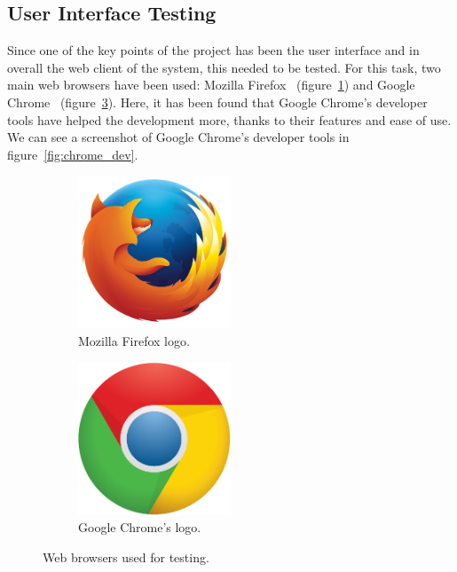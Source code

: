 \subsection{User Interface Testing}

Since one of the key points of the project has been the user interface and in overall the web client
of the system, this needed to be tested. For this task, two main web browsers have been used:
Mozilla Firefox~\cite{firefox_web} (figure~\ref{subfig:firefox}) and Google Chrome~\cite{chrome_web}
(figure~\ref{subfig:chrome}). Here, it has been found that Google Chrome's developer tools have
helped the development more, thanks to their features and ease of use. We can see a screenshot of
Google Chrome's developer tools in figure~\ref{fig:chrome_dev}.

\begin{figure}[!htbp]
	\centering
	\begin{subfigure}{0.45\textwidth}
		\centering
		\includegraphics[width=0.5\textwidth]{fig/firefox}
		\caption{Mozilla Firefox logo.}\label{subfig:firefox}
	\end{subfigure}\quad
	\begin{subfigure}{0.45\textwidth}
		\centering
		\includegraphics[width=0.5\textwidth]{fig/chrome}
		\caption{Google Chrome's logo.}\label{subfig:chrome}
	\end{subfigure}\quad
	\caption{Web browsers used for testing.}
\end{figure}

